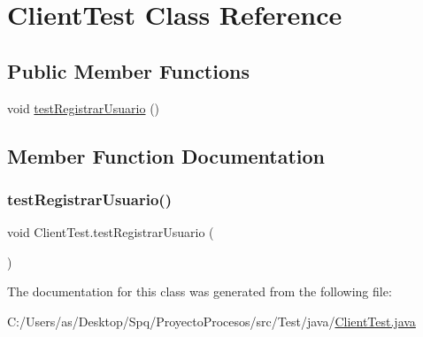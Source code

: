\hypertarget{class_client_test}{}\section{Client\+Test Class Reference}
\label{class_client_test}
\subsection*{Public Member Functions}
\begin{DoxyCompactItemize}
\item 
void \mbox{\hyperlink{class_client_test_a3ce212ac9c94011a253bb116f4237513}{test\+Registrar\+Usuario}} ()
\end{DoxyCompactItemize}


\subsection{Member Function Documentation}
\mbox{\label{class_client_test_a3ce212ac9c94011a253bb116f4237513}} 
\subsubsection{\texorpdfstring{testRegistrarUsuario()}{testRegistrarUsuario()}}
{\footnotesize\ttfamily void Client\+Test.\+test\+Registrar\+Usuario (\begin{DoxyParamCaption}{ }\end{DoxyParamCaption})}



The documentation for this class was generated from the following file\+:\begin{DoxyCompactItemize}
\item 
C\+:/\+Users/as/\+Desktop/\+Spq/\+Proyecto\+Procesos/src/\+Test/java/\mbox{\hyperlink{_client_test_8java}{Client\+Test.\+java}}\end{DoxyCompactItemize}
